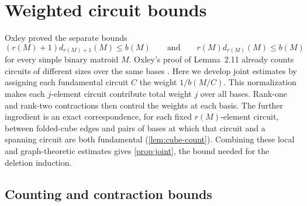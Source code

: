 \documentclass[11pt]{article}
\numberwithin{equation}{section}
\begin{document}
\section{Weighted circuit bounds}\label{sec:weights}
Oxley \cite[Lemmas~2.2 and~2.7]{Oxley1983} proved the separate bounds
\[
(r(M)+1)d_{r(M)+1}(M)\le b(M)\qquad\text{and}\qquad r(M)d_{r(M)}(M)\le b(M)
\]
for every simple binary matroid \(M\).
Oxley's proof of Lemma~2.11 already counts circuits of different sizes
over the same bases \cite{Oxley1983}.
Here we develop joint estimates by assigning each fundamental circuit
\(C\) the weight \(1/b(M/C)\). This normalization makes each
\(j\)-element circuit contribute total weight \(j\) over all bases.
Rank-one and rank-two contractions then control the weights at each basis.
The further ingredient is an exact correspondence, for each fixed
\(r(M)\)-element circuit, between folded-cube edges and pairs of bases
at which that circuit and a spanning circuit are both fundamental
(\autoref{lem:cube-count}).
Combining these local and graph-theoretic estimates gives
\autoref{prop:joint}, the bound needed for the deletion induction.

\subsection{Counting and contraction bounds}
\end{document}
